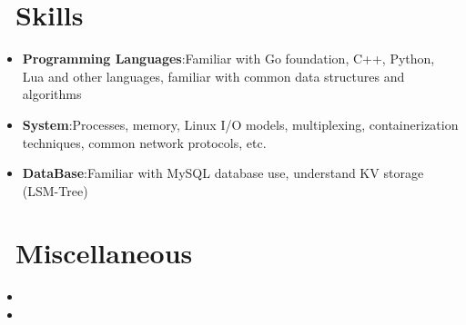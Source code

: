 \documentclass{resume}
\newcommand{\en}[1]{#1}
\newcommand{\zh}[1]{}
\begin{document}
\section{\faCogs\ \en{Skills}\zh{技能}}
\begin{itemize}[parsep=0.5ex]
      \item \en{\textbf{Programming Languages}:Familiar with Go foundation, C++, Python, Lua and other languages, familiar with common data structures and algorithms}
            \zh{\textbf{编程语言}: 熟悉 Go 基础,了解 C++、Python、Lua 等语言,熟悉常用数据结构与算法}
      \item \en{\textbf{System}:Processes, memory, Linux I/O models, multiplexing, containerization techniques, common network protocols, etc.}
            \zh{\textbf{系统}: 进程、内存、Linux I/O 模型、多路复用、容器化技术、常见网络协议等}
      \item \en{\textbf{DataBase}:Familiar with MySQL database use, understand KV storage (LSM-Tree)}
            \zh{\textbf{数据库}: 熟悉 MySQL 数据库使用,了解 KV 存储(LSM-Tree)}
\end{itemize}

\section{\faInfo\ \en{Miscellaneous}\zh{杂项}}
\begin{itemize}[parsep=0.5ex]
      \item \en{}
            \zh{喜欢折腾,搭建过 Gitea、Minio、Grafana 等服务}
      \item \en{}
            \zh{热爱写代码和了解有趣的知识,自己平常实现过一些小项目(手写Git,简单全文搜索引擎,静态博客生成器,DNS 服务器等等)}
      
\end{itemize}
\end{document}
